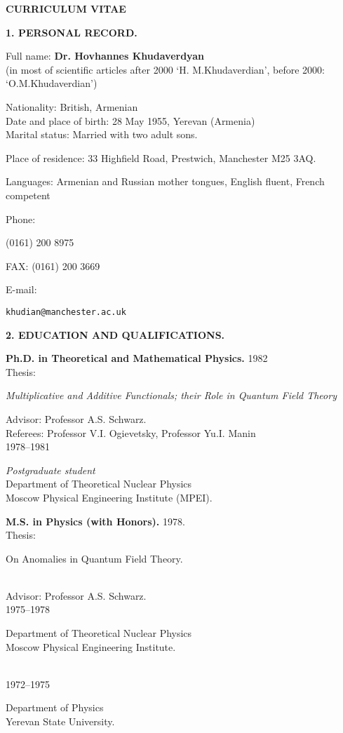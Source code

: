 \documentclass[12pt]{article}
\newcommand{\punkt}{\par\medskip\noindent}
\newcommand{\razdel}{\par\bigskip\noindent}
\newcommand{\ots}{\hspace*{2em}}
\begin{document}
 \begin{center}
 \Large \bf CURRICULUM VITAE
 \end{center}
 \punkt
 \begin{center}
 \large \bf 1. PERSONAL RECORD.
 \end{center}
   \punkt
   Full name: {\bf Dr. Hovhannes Khudaverdyan}\\
        (in most of scientific articles after 2000 
`H. M.Khudaverdian', before 2000: `O.M.Khudaverdian')
   \punkt
  Nationality: British, Armenian \\
Date and place of birth: 28 May 1955, Yerevan (Armenia)\\

\noindent Marital status: Married with two adult sons.

 \noindent Place of residence: 33 Highfield Road, Prestwich, Manchester M25 3AQ.

\noindent Languages: Armenian and Russian mother tongues, English fluent, French competent

\punkt
 Phone: \parbox[t]{6cm}{ (0161) 200 8975}
\par\smallskip\noindent
FAX: (0161) 200 3669
   \par\smallskip\noindent
 E-mail:  \parbox[t]{5in}{\tt khudian@manchester.ac.uk}


  \razdel
   \begin{center}
 \large \bf 2. EDUCATION AND QUALIFICATIONS.
   \end{center}
   \punkt
 {\bf Ph.D. in Theoretical and Mathematical Physics.}         1982\\
   \ots Thesis: \parbox[t]{3.8in}{\it Multiplicative and Additive Functionals;
                their Role in  Quantum Field Theory}
\par\smallskip\noindent
   \ots Advisor: Professor A.S. Schwarz.\\
   \ots Referees: Professor V.I. Ogievetsky, Professor Yu.I.
   Manin
   \smallskip\\
    1978--1981  \quad\parbox[t]{5in}{{\it Postgraduate student}\\Department
               of  Theoretical Nuclear Physics\\ Moscow Physical
  Engineering Institute (MPEI). }

 \punkt
 {\bf M.S. in Physics (with Honors).}  1978.\\
   \ots              Thesis:  \parbox[t]{5in}
{On Anomalies in Quantum Field Theory.}\\
    \ots         Advisor: Professor A.S. Schwarz.
                                 \smallskip\\
  1975--1978 \quad \parbox[t]{5in}{Department of Theoretical Nuclear
                                  Physics\\
                Moscow Physical Engineering Institute.}
\smallskip\\
  1972--1975 \quad \parbox[t]{5in}{Department of Physics\\
               Yerevan State University.}
\end{document}
